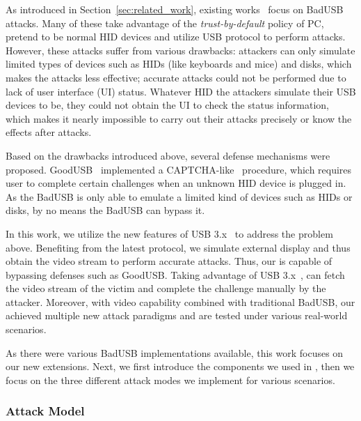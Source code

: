 As introduced in Section~\ref{sec:related_work},
existing works~\cite{rubber,badusb,
rubberducky2020,usbbypassing,iseeyou,usbdriver} focus on BadUSB attacks.
Many of these take advantage of the \textit{trust-by-default} policy of PC,
pretend to be normal HID devices and utilize USB protocol to perform attacks.
However, these attacks suffer from various drawbacks:  attackers can
only simulate limited types of devices such as HIDs (like keyboards and mice)
and disks, which makes the attacks less effective;  accurate attacks
could not be performed due to lack of user interface (UI) status. Whatever HID the
attackers simulate their USB devices to be, they could not obtain the UI to
check the status information, which makes it nearly impossible to carry out
their attacks precisely or know the effects after attacks.

Based on the drawbacks introduced above, several defense mechanisms were
proposed. GoodUSB~\cite{tian2015defending}
implemented a CAPTCHA-like~\cite{captcha} procedure, which requires user to
complete certain challenges when an unknown HID device is plugged in. As the
BadUSB is only able to emulate a limited kind of devices such as HIDs or disks, by
no means the BadUSB can bypass it.

In this work, we utilize the new features of USB 3.x~\cite{usb31,usb32} to
address the problem above.  Benefiting from the latest protocol, we simulate
external display and thus obtain the video stream to perform accurate
attacks.
Thus, our \tool is capable of
bypassing defenses such as GoodUSB. Taking advantage of USB 3.x~\cite{usb31,usb32},
\tool can fetch the video stream of the victim and complete the challenge
manually by the attacker. Moreover, with video capability combined with
traditional BadUSB, our \tool achieved multiple new attack paradigms and are
tested under various real-world scenarios.

As there were various BadUSB implementations available, this work focuses on our new extensions. Next, we first introduce the
components we used in \tool, then we focus on the three different attack modes
we implement for various scenarios.

\subsubsection{Attack Model}

